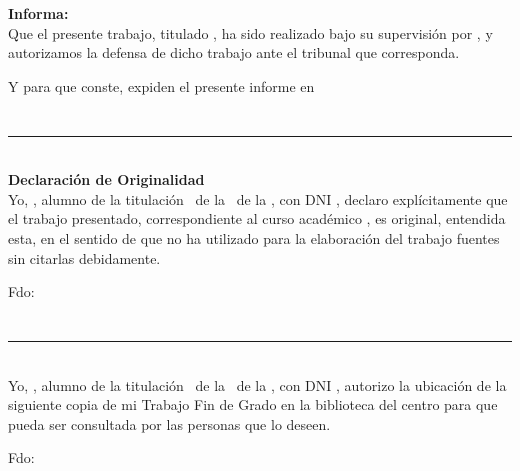 \textbf{Informa:} \\

Que el presente trabajo, titulado \thetitle, ha sido realizado bajo su supervisión por \theauthor, y autorizamos la defensa de dicho trabajo ante el tribunal que corresponda.

\vspace{1cm}

Y para que conste, expiden el presente informe en \myLocation

\chapter*{}
\thispagestyle{empty}

\noindent\rule[-1ex]{\textwidth}{2pt}\\[4.5ex]

\textbf{Declaración de Originalidad} \\

Yo, \textbf{\theauthor}, alumno de la titulación \grado \ de la \myFacultyShort \ de la \myUni, con DNI \dni, declaro explícitamente que el trabajo presentado, correspondiente al curso académico \curso, es original, entendida esta, en el sentido de que no ha utilizado para la elaboración del trabajo fuentes sin citarlas debidamente.

\vspace{4cm}

\noindent Fdo: \theauthor

\vspace{1cm}

\begin{flushright}
\myLocation
\end{flushright}


\chapter*{}
\thispagestyle{empty}

\noindent\rule[-1ex]{\textwidth}{2pt}\\[4.5ex]

Yo, \textbf{\theauthor}, alumno de la titulación \grado \ de la \myFacultyShort \ de la \myUni, con DNI \dni, autorizo la ubicación de la siguiente copia de mi Trabajo Fin de Grado en la biblioteca del centro para que pueda ser consultada por las personas que lo deseen.

\vspace{4cm}

\noindent Fdo: \theauthor

